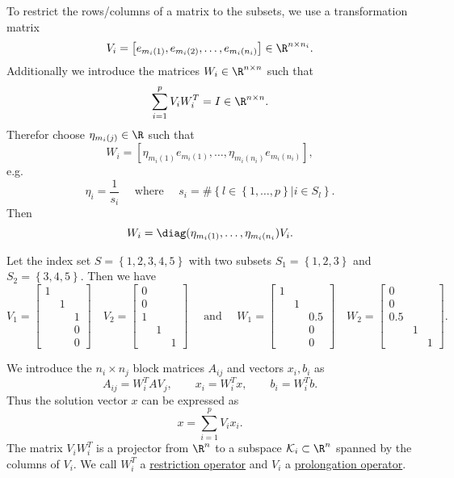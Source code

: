 To restrict the rows/columns of a matrix to the subsets, we use a transformation matrix
\[
	V_{i}= \left[ e_{m_{i}(1)}, e_{m_{i}(2)}, \ldots , e_{m_{i}(n_{i})} \right] \in \R^{n \times n_{i}}
.\] 
Additionally we introduce the matrices $W_{i} \in \R^{n \times n}$ such that
\[
\sum_{i=1}^{p}{V_{i}W_{i}^{T}} = I \in \R^{n \times n}
.\] 
Therefor choose $\eta _{m_{i}(j)} \in \R$ such that
\[
	W_{i} = \left[ \eta _{m_{i}(1)}e_{m_{i}(1)}, \ldots , \eta _{m_{i}(n_{i})}e_{m_{i}(n_{i})} \right] 
,\] 
e.g.
\[
\eta _{i} = \frac{1}{s_{i}} \quad\text{ where }\quad s_{i} = \# \left\{  l \in \left\{ 1, \ldots, p \right\} | i \in S_{l} \right\} 
.\] 
Then
\[
	W_{i} = \diag(\eta _{m_{i}(1)}, \ldots , \eta _{m_{i}(n_{i}}) V_{i}
.\] 

\begin{exam}
	Let the index set $S= \left\{ 1,2,3,4,5 \right\} $ with two subsets $S_1 = \left\{  1,2,3 \right\} $ and $S_2 = \left\{ 3,4,5 \right\} $. Then we have
	\[
	V_{1}= \begin{bmatrix}
	1 \\
	& 1 \\
	&&1 \\
	&&0 \\
	&&0 
	\end{bmatrix}
	\quad
	V_2 = \begin{bmatrix}
	0 \\
	0 \\
	1 \\
	& 1 \\
	&& 1
	\end{bmatrix}
	\quad \text{ and } \quad
	W_1 = \begin{bmatrix}
	1 \\
	& 1 \\
	&&0.5 \\
	&&0 \\
	&&0
	\end{bmatrix}
	\quad
	W_2 = \begin{bmatrix}
	0 \\
	0 \\
	0.5 \\
	& 1\\ 
	&& 1
	\end{bmatrix}
	.\] 
\end{exam}

We introduce the $n_{i} \times n_{j}$ block matrices $A_{ij}$ and vectors $x_{i}, b_{i}$ as 
\[
A_{ij} = W_{i}^{T}AV_{j}, \qquad x_{i} = W_{i}^{T}x, \qquad b_{i}= W_{i}^{T}b
.\] 
Thus the solution vector $x$ can be expressed as 
\[
x = \sum_{i=1}^{p}{V_{i}x_{i}}
.\] 
The matrix $V_{i}W_{i}^{T}$ is a projector from $\R^{n}$ to a subspace $\mathcal{K}_{i} \subset \R^{n}$ spanned by the columns of $V_{i}$. We call $W_{i}^{T}$ a \underline{restriction operator} and $V_{i}$ a \underline{prolongation operator}.

